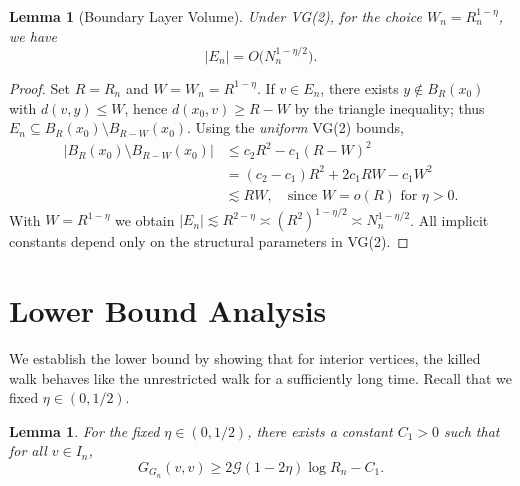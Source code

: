 \documentclass{article}
\numberwithin{equation}{section}
\newtheorem{lemma}[theorem]{Lemma}
\theoremstyle{definition}
\theoremstyle{remark}
\newcommand{\cG}{\mathcal{G}}
\begin{document}
\begin{lemma}[Boundary Layer Volume]\label{lem:boundary_volume}
Under VG(2), for the choice $W_n = R_n^{1-\eta}$, we have
\[
    |E_n| = O\bigl(N_n^{1-\eta/2}\bigr).
\]
\end{lemma}
\begin{proof}
Set $R=R_n$ and $W=W_n=R^{1-\eta}$. If $v\in E_n$, there exists $y\notin B_R(x_0)$ with $d(v,y)\le W$, hence
$d(x_0,v)\ge R-W$ by the triangle inequality; thus $E_n\subseteq B_R(x_0)\setminus B_{R-W}(x_0)$. Using the \emph{uniform} VG(2) bounds,
\begin{align*}
|B_R(x_0)\setminus B_{R-W}(x_0)| &\le c_2 R^2 - c_1 (R-W)^2 \\
  &= (c_2-c_1)R^2 + 2c_1 R W - c_1 W^2 \\
  &\lesssim R W, \quad \text{since $W=o(R)$ for $\eta>0$.}
\end{align*}
With $W=R^{1-\eta}$ we obtain $|E_n|\lesssim R^{2-\eta}\asymp (R^2)^{1-\eta/2} \asymp N_n^{1-\eta/2}$.
All implicit constants depend only on the structural parameters in VG(2).
\end{proof}

\section{Lower Bound Analysis}\label{sec:lower_bound}

We establish the lower bound by showing that for interior vertices, the killed walk behaves like the unrestricted walk for a sufficiently long time.
Recall that we fixed $\eta \in (0, 1/2)$.

\begin{lemma}\label{lem:lower}
For the fixed $\eta \in (0,1/2)$, there exists a constant $C_1 > 0$ such that for all $v \in I_n$,
\[
G_{G_n}(v,v) \geq 2\cG(1-2\eta)\log R_n - C_1.
\]
\end{lemma}
\end{document}

